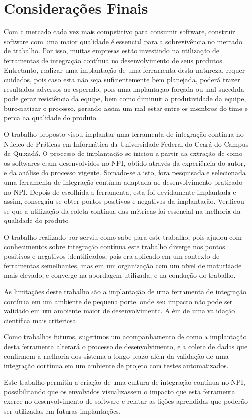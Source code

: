 \chapter{Considerações Finais}\label{consideracoes-finais}

Com o mercado cada vez mais competitivo para consumir software, construir software com uma maior qualidade é essencial para a sobrevivência no mercado de trabalho. Por isso, muitas empresas estão investindo na utilização de ferramentas de integração contínua no desenvolvimento de seus produtos. Entretanto, realizar uma implantação de uma ferramenta desta natureza, requer cuidados, pois caso esta não seja suficientemente bem planejada, poderá trazer resultados adversos ao esperado, pois uma implantação forçada ou mal sucedida pode gerar resistência da equipe, bem como diminuir a produtividade da equipe, burocratizar o processo, gerando assim um mal estar entre os membros do time e perca na qualidade do produto.

O trabalho proposto visou implantar uma ferramenta de integração contínua no Núcleo de Práticas em Informática da Universidade Federal do Ceará do Campus de Quixadá. O processo de implantação se iniciou a partir da extração de como os softwares eram desenvolvidos no NPI, obtido através da experiência do autor, e da análise do processo vigente. Somado-se a isto, fora pesquisada e selecionada uma ferramenta de integração contínua adaptada ao desenvolvimento praticado no NPI. Depois de escolhida a ferramenta, esta foi devidamente implantada e assim, conseguiu-se obter pontos positivos e negativos da implantação. Verificou-se que a utilização da coleta contínua das métricas foi essencial na melhoria da qualidade do produto.


O trabalho realizado por  serviu como sabe para este trabalho, pois ajudou com conhecimentos sobre integração contínua este trabalho diverge nos pontos positivos e negativos identificados, pois era aplicado em um contexto de ferramentas semelhantes, mas em um organização com um nível de maturidade mais elevado, e converge na abordagem utilizada, e na condução do trabalho.
 

As limitações deste trabalho são a implantação de uma ferramenta de integração contínua em um ambiente de pequeno porte, onde seu impacto não pode ser validado em um ambiente maior de desenvolvimento. Além de uma validação científica mais criteriosa.

Como trabalhos futuros, sugerimos um acompanhamento de como a implantação desta ferramenta alterará o processo de desenvolvimento, e a coleta de dados que confirmem a melhoria dos sistema a longo prazo além da validação de uma integração contínua em um ambiente de projeto com testes automatizados.


Este trabalho permitiu a criação de uma cultura de integração contínua no NPI, possibilitando que os envolvidos visualizassem o impacto que esta ferramenta exerce no desenvolvimento do software e relatar as lições aprendidas que poderão ser utilizadas em futuras implantações.

